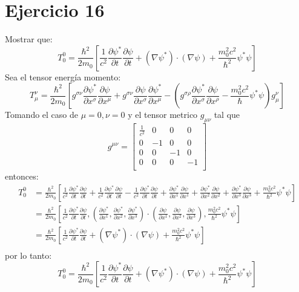 \section*{Ejercicio 16}
Mostrar que:
\begin{equation*}
    T_0^0 = \frac{\hbar^2}{2m_0} \left[\frac{1}{c^2} \frac{\partial \psi^*}{\partial t}\frac{\partial \psi}{\partial t}+ \left(\nabla \psi^*\right)\cdot \left(\nabla \psi \right)+ \frac{m_0^2c^2}{\hbar^2} \psi^* \psi \right]  
\end{equation*}
Sea el tensor energía momento:
\begin{equation*}
    T_\mu^\nu = \frac{\hbar^2}{2m_0} \left[g^{\sigma \nu} \frac{\partial \psi^*}{\partial x^\sigma}
    \frac{\partial \psi}{\partial x^\mu}+g^{\sigma \nu} \frac{\partial \psi}{\partial x^\sigma}
    \frac{\partial \psi^*}{\partial x^\mu}-\left(g^{\sigma \rho} \frac{\partial \psi^*}{\partial x^\sigma}
    \frac{\partial \psi}{\partial x^\rho}-\frac{m_0^2 c^2}{\hbar}\psi^*\psi\right)g_\mu^\nu\right]
\end{equation*}
Tomando el caso de $\mu=0,\nu=0$ y el tensor metrico $g_{\mu\nu}$ tal que
\begin{equation*}
    g^{\mu\nu}= \left[\begin{matrix}
        \frac{1}{c^2} & 0 & 0 & 0 \\
        0 & -1 & 0 & 0 \\
        0 &  0& -1 & 0 \\
        0 & 0 & 0 & -1 \\
    \end{matrix}\right]
\end{equation*}
entonces:%
\begin{align*}
    T_0^0   & =\frac{\hbar^2}{2m_0}\left[\frac{1}{c^2} \frac{\partial \psi^*}{\partial t}\frac{\partial \psi}{\partial t}+\frac{1}{c^2} \frac{\partial \psi^*}{\partial t}\frac{\partial \psi}{\partial t}-\frac{1}{c^2} \frac{\partial \psi^*}{\partial t}\frac{\partial \psi}{\partial t}+\frac{\partial \psi^*}{\partial x^1} \frac{\partial \psi}{\partial x^1}+\frac{\partial \psi^*}{\partial x^2} \frac{\partial \psi}{\partial x^2}+\frac{\partial \psi^*}{\partial x^3} \frac{\partial \psi}{\partial x^3}+\frac{m_0^2 c^2}{\hbar^2}\psi^* \psi \right]\\
            & =\frac{\hbar^2}{2m_0}\left[ \frac{1}{c^2} \frac{\partial \psi^*}{\partial t}\frac{\partial \psi}{\partial t} ,\left(\frac{\partial \psi^*}{\partial x^1},\frac{\partial \psi^*}{\partial x^2},\frac{\partial \psi^*}{\partial x^3}\right) \cdot \left(\frac{\partial \psi}{\partial x^1},\frac{\partial \psi}{\partial x^2},\frac{\partial \psi}{\partial x^3}\right), \frac{m_0^2 c^2}{\hbar^2} \psi^* \psi\right]\\
            & =\frac{\hbar^2}{2m_0}\left[\frac{1}{c^2} \frac{\partial \psi^*}{\partial t}\frac{\partial \psi}{\partial t} +\left(\nabla \psi^*\right) \cdot \left(\nabla \psi\right)+ \frac{m_0^2 c^2}{\hbar^2} \psi^* \psi\right]\\
\end{align*}
por lo tanto:
\begin{equation*}
    T_0^0 = \frac{\hbar^2}{2m_0} \left[\frac{1}{c^2} \frac{\partial \psi^*}{\partial t}\frac{\partial \psi}{\partial t}+ \left(\nabla \psi^*\right)\cdot \left(\nabla \psi \right)+ \frac{m_0^2c^2}{\hbar^2} \psi^* \psi \right]  
\end{equation*}